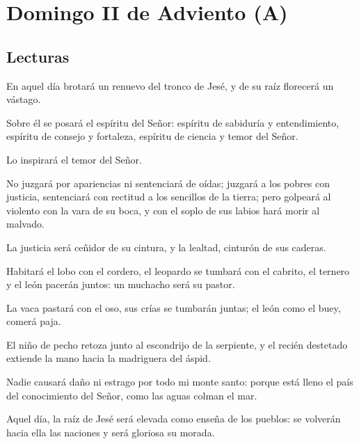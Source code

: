 \chapter{Domingo II de Adviento (A)}

\section{Lecturas}


 


\begin{readprose}
	En aquel día brotará un renuevo del tronco de Jesé, 
	y de su raíz florecerá un vástago.
	
	Sobre él se posará el espíritu del Señor: 
	espíritu de sabiduría y entendimiento, 
	espíritu de consejo y fortaleza, 
	espíritu de ciencia y temor del Señor.
	
	Lo inspirará el temor del Señor. 
	
	No juzgará por apariencias 
	ni sentenciará de oídas; 
	juzgará a los pobres con justicia, 
	sentenciará con rectitud a los sencillos de la tierra; 
	pero golpeará al violento con la vara de su boca, 
	y con el soplo de sus labios hará morir al malvado.
	
	La justicia será ceñidor de su cintura, 
	y la lealtad, cinturón de sus caderas.
	
	Habitará el lobo con el cordero, 
	el leopardo se tumbará con el cabrito, 
	el ternero y el león pacerán juntos: 
	un muchacho será su pastor.
	
	La vaca pastará con el oso, 
	sus crías se tumbarán juntas; 
	el león como el buey, comerá paja.
	
	El niño de pecho retoza junto al escondrijo de la serpiente, 
	y el recién destetado extiende la mano 
	hacia la madriguera del áspid.
	
	Nadie causará daño ni estrago 
	por todo mi monte santo: 
	porque está lleno el país del conocimiento del Señor, 
	como las aguas colman el mar.
	
	Aquel día, la raíz de Jesé será elevada 
	como enseña de los pueblos: 
	se volverán hacia ella las naciones 
	y será gloriosa su morada.
\end{readprose}


 

